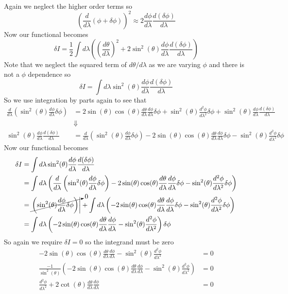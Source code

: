 \documentclass[11pt]{article}
\numberwithin{equation}{section}
\begin{document}
\begin{enumerate}[(a)]
\begin{align*}
\end{align*}
Again we neglect the higher order terms so
$$\left(\frac{d}{d\lambda}(\phi+\delta\phi)\right)^2 \approx  2\frac{d\phi}{d\lambda}\frac{d(\delta\phi)}{d\lambda}$$
Now our functional becomes
$$\delta I = \frac{1}{2}\int d\lambda \left(\left(\frac{d\theta}{d\lambda}\right)^2 + 2\sin^2(\theta)\frac{d\phi}{d\lambda}\frac{d(\delta\phi)}{d\lambda}\right)$$
Note that we neglect the squared term of $d\theta/d\lambda$ as we are varying $\phi$ and there is not a $\phi$ dependence so
$$\delta I = \int d\lambda\sin^2(\theta)\frac{d\phi}{d\lambda}\frac{d(\delta\phi)}{d\lambda}$$
So we use integration by parts again to see that
\begin{align*}
\frac{d}{d\lambda}\left(\sin^2(\theta)\frac{d\phi}{d\lambda}\delta\phi\right) &= 2\sin(\theta)\cos(\theta)\frac{d\theta}{d\lambda}\frac{d\phi}{d\lambda}\delta\phi + \sin^2(\theta)\frac{d^2\phi}{d\lambda^2}\delta\phi + \sin^2(\theta)\frac{d\phi}{d\lambda}\frac{d(\delta\phi)}{d\lambda}\\
&\Downarrow\\
\sin^2(\theta)\frac{d\phi}{d\lambda}\frac{d(\delta\phi)}{d\lambda} &= \frac{d}{d\lambda}\left(\sin^2(\theta)\frac{d\phi}{d\lambda}\delta\phi\right) - 2\sin(\theta)\cos(\theta)\frac{d\theta}{d\lambda}\frac{d\phi}{d\lambda}\delta\phi - \sin^2(\theta)\frac{d^2\phi}{d\lambda^2}\delta\phi 
\end{align*}
Now our functional becomes 
\begin{align*}
\delta I &= \int d\lambda\sin^2(\theta)\frac{d\phi}{d\lambda}\frac{d(\delta\phi)}{d\lambda}\\
&= \int d\lambda\left(\frac{d}{d\lambda}\left(\sin^2(\theta)\frac{d\phi}{d\lambda}\delta\phi\right) - 2\sin(\theta)\cos(\theta)\frac{d\theta}{d\lambda}\frac{d\phi}{d\lambda}\delta\phi - \sin^2(\theta)\frac{d^2\phi}{d\lambda^2}\delta\phi \right)\\
&= \cancelto{0}{\left.\left(\sin^2(\theta)\frac{d\phi}{d\lambda}\delta\phi\right)\right|} + \int d\lambda\left(- 2\sin(\theta)\cos(\theta)\frac{d\theta}{d\lambda}\frac{d\phi}{d\lambda}\delta\phi - \sin^2(\theta)\frac{d^2\phi}{d\lambda^2}\delta\phi \right)\\
&=  \int d\lambda\left(-2\sin(\theta)\cos(\theta)\frac{d\theta}{d\lambda}\frac{d\phi}{d\lambda} - \sin^2(\theta)\frac{d^2\phi}{d\lambda^2}\right)\delta\phi 
\end{align*}
So again we require $\delta I = 0$ so the integrand must be zero
\begin{align*}
-2\sin(\theta)\cos(\theta)\frac{d\theta}{d\lambda}\frac{d\phi}{d\lambda} - \sin^2(\theta)\frac{d^2\phi}{d\lambda^2} &= 0\\
\frac{-1}{\sin^2(\theta)}\left(-2\sin(\theta)\cos(\theta)\frac{d\theta}{d\lambda}\frac{d\phi}{d\lambda} - \sin^2(\theta)\frac{d^2\phi}{d\lambda^2}\right) &= 0\\
\frac{d^2\phi}{d\lambda^2} + 2\cot(\theta)\frac{d\theta}{d\lambda}\frac{d\phi}{d\lambda}  &= 0
\end{align*}


\end{enumerate}
\end{document}
